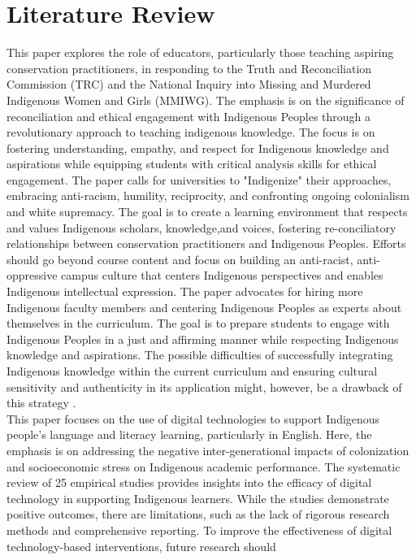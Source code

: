 \documentclass[final,12p,twocolumn]{article}
\begin{document}
\section{Literature Review}
This paper explores the role of educators, particularly those teaching aspiring conservation practitioners, in responding to the Truth and Reconciliation Commission (TRC) and the National Inquiry into Missing and Murdered Indigenous Women and Girls (MMIWG). The emphasis is on the significance of reconciliation and ethical engagement with Indigenous Peoples through a revolutionary approach to teaching indigenous knowledge. The focus is on fostering understanding, empathy, and respect for Indigenous knowledge and aspirations while equipping students with critical analysis skills for ethical engagement. The paper calls for universities to "Indigenize" their approaches, embracing anti-racism, humility, reciprocity, and confronting ongoing colonialism and white supremacy. The goal is to create a learning environment that respects and values Indigenous scholars, knowledge,and voices, fostering re-conciliatory relationships between conservation practitioners and Indigenous Peoples. Efforts should go beyond course content and focus on building an anti-racist, anti-oppressive campus culture that
centers Indigenous perspectives and enables Indigenous intellectual expression. The paper advocates for hiring more Indigenous faculty members and centering Indigenous Peoples as experts about themselves in the curriculum. The goal is to prepare students to engage with Indigenous Peoples in a just and affirming manner while respecting Indigenous knowledge and aspirations. The possible difficulties of successfully integrating Indigenous knowledge within the current curriculum and ensuring cultural sensitivity and authenticity in its application might, 
 however, be a drawback of this strategy \cite{r10}.
\\This paper focuses on the use of digital technologies to support Indigenous people’s language and literacy learning, particularly in English. Here, the emphasis is on addressing the negative inter-generational impacts of colonization and socioeconomic stress on Indigenous academic performance. The systematic review of 25 empirical studies provides insights into the efficacy of digital technology in supporting Indigenous learners. While the studies demonstrate positive outcomes, there are limitations, such as the lack of rigorous research methods and comprehensive reporting. To improve the effectiveness
of digital technology-based interventions, future research should
\end{document}
